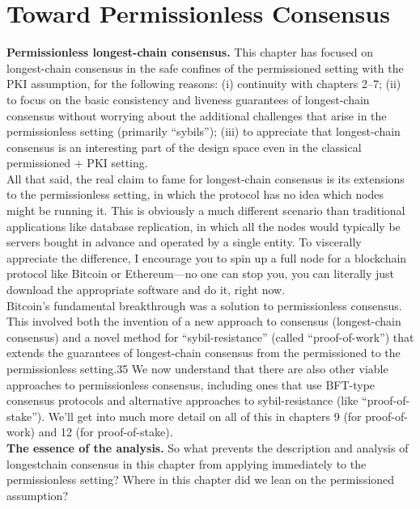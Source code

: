 \section{Toward Permissionless Consensus}
\noindent
\textbf{Permissionless longest-chain consensus.} This chapter has focused on longest-chain consensus in the safe confines of the permissioned setting with the PKI assumption, for the
following reasons: (i) continuity with chapters 2–7; (ii) to focus on the basic consistency
and liveness guarantees of longest-chain consensus without worrying about the additional
challenges that arise in the permissionless setting (primarily “sybils”); (iii) to appreciate
that longest-chain consensus is an interesting part of the design space even in the classical
permissioned + PKI setting.\\

All that said, the real claim to fame for longest-chain consensus is its extensions to the
permissionless setting, in which the protocol has no idea which nodes might be running
it. This is obviously a much different scenario than traditional applications like database
replication, in which all the nodes would typically be servers bought in advance and operated
by a single entity. To viscerally appreciate the difference, I encourage you to spin up a full
node for a blockchain protocol like Bitcoin or Ethereum—no one can stop you, you can
literally just download the appropriate software and do it, right now.\\

Bitcoin’s fundamental breakthrough was a solution to permissionless consensus. This
involved both the invention of a new approach to consensus (longest-chain consensus) and
a novel method for “sybil-resistance” (called “proof-of-work”) that extends the guarantees
of longest-chain consensus from the permissioned to the permissionless setting.35 We now
understand that there are also other viable approaches to permissionless consensus, including
ones that use BFT-type consensus protocols and alternative approaches to sybil-resistance
(like “proof-of-stake”). We’ll get into much more detail on all of this in chapters 9 (for
proof-of-work) and 12 (for proof-of-stake).\\

\noindent
\textbf{The essence of the analysis.} So what prevents the description and analysis of longestchain consensus in this chapter from applying immediately to the permissionless setting?
Where in this chapter did we lean on the permissioned assumption?

